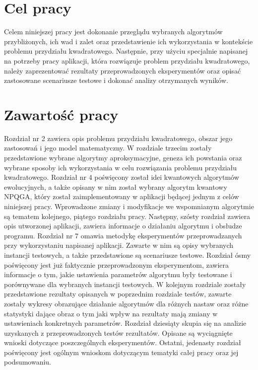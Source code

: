 \section{Cel pracy}
\label{sec:cel}
Celem niniejszej pracy jest dokonanie przeglądu wybranych algorytmów przybliżonych, ich wad i zalet oraz przedstawienie ich wykorzystania w kontekście problemu przydziału kwadratowego. Następnie, przy użyciu specjalnie napisanej na potrzeby pracy aplikacji, która rozwiązuje problem przydziału kwadratowego, należy zaprezentować rezultaty przeprowadzonych eksperymentów oraz opisać zastosowane scenariusze testowe i dokonać analizy otrzymanych wyników.

\section{Zawartość pracy}
\label{sec:zawartosc}
Rozdział nr 2 zawiera opis problemu przydziału kwadratowego, obszar jego zastosowań i jego model matematyczny. W rozdziale trzecim zostały przedstawione wybrane algorytmy aproksymacyjne, geneza ich powstania oraz wybrane sposoby ich wykorzystania w celu rozwiązania problemu przydziału kwadratowego. Rozdział nr 4 poświęcony został idei kwantowych algorytmów ewolucyjnych, a także opisany w nim został wybrany algorytm kwantowy NPQGA, który został zaimplementowany w aplikacji będącej jednym z celów niniejszej pracy. Wprowadzone zmiany i modyfikacje we wspomnianym algorytmie są tematem kolejnego, piątego rozdziału pracy. Następny, szósty rozdział zawiera opis utworzonej aplikacji, zawiera informacje o działaniu algorytmu i obsłudze programu. Rozdział nr 7 omawia metodykę eksperymentów przeprowadzanych przy wykorzystaniu napisanej aplikacji. Zawarte w nim są opisy wybranych instancji testowych, a także przedstawione są scenariusze testowe. Rozdział ósmy  poświęcony jest już faktycznie przeprowadzonym eksperymentom, zawiera informacje o tym, jakie ustawienia parametrów algorytmu były testowane i porównywane dla wybranych instancji testowych. W kolejnym rozdziale zostały przedstawione rezultaty opisanych w poprzednim rozdziale testów, zawarte zostały wykresy obrazujące działanie algorytmów dla różnych nastaw oraz różne statystyki dające obraz o tym jaki wpływ na rezultaty mają zmiany w ustawieniach konkretnych parametrów. Rozdział dziesiąty skupia się na analizie uzyskanych z przeprowadzonych testów rezultatów. Opisane są wyciągnięte wnioski dotyczące poszczególnych eksperymentów. Ostatni, jedenasty rozdział poświęcony jest ogólnym wnioskom dotyczącym tematyki całej pracy oraz jej podsumowaniu.